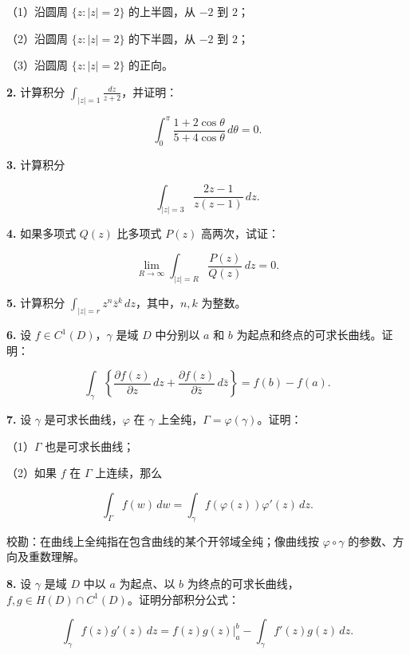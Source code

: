 \documentclass[11pt,a4paper]{article}
\begin{document}
（1）沿圆周 \(\{z:|z|=2\}\) 的上半圆，从 \(-2\) 到 \(2\)；

（2）沿圆周 \(\{z:|z|=2\}\) 的下半圆，从 \(-2\) 到 \(2\)；

（3）沿圆周 \(\{z:|z|=2\}\) 的正向。

\par{}
\noindent\textbf{2.} 计算积分 \(\int_{|z|=1}\frac{dz}{z+2}\)，并证明：

\[
\int_0^\pi\frac{1+2\cos\theta}{5+4\cos\theta}\,d\theta=0.
\]

\par{}
\noindent\textbf{3.} 计算积分

\[
\int_{|z|=3}\frac{2z-1}{z(z-1)}\,dz.
\]

\par{}
\noindent\textbf{4.} 如果多项式 \(Q(z)\) 比多项式 \(P(z)\) 高两次，试证：

\[
\lim_{R\to\infty}\int_{|z|=R}\frac{P(z)}{Q(z)}\,dz=0.
\]

\par{}
\noindent\textbf{5.} 计算积分 \(\int_{|z|=r}z^n\bar z^k\,dz\)，其中，\(n,k\)
为整数。

\par{}
\noindent\textbf{6.} 设 \(f\in C^1(D)\)，\(\gamma\) 是域 \(D\) 中分别以 \(a\) 和
\(b\) 为起点和终点的可求长曲线。证明：

\[
\int_\gamma\left\{\frac{\partial f(z)}{\partial z}\,dz
+\frac{\partial f(z)}{\partial\bar z}\,d\bar z\right\}=f(b)-f(a).
\]

\par{}
\noindent\textbf{7.} 设 \(\gamma\) 是可求长曲线，\(\varphi\) 在 \(\gamma\)
上全纯，\(\Gamma=\varphi(\gamma)\)。证明：

（1）\(\Gamma\) 也是可求长曲线；

（2）如果 \(f\) 在 \(\Gamma\) 上连续，那么

\[
\int_\Gamma f(w)\,dw
=\int_\gamma f(\varphi(z))\varphi'(z)\,dz.
\]

校勘：在曲线上全纯指在包含曲线的某个开邻域全纯；像曲线按
\(\varphi\circ\gamma\) 的参数、方向及重数理解。

\par{}
\noindent\textbf{8.} 设 \(\gamma\) 是域 \(D\) 中以 \(a\) 为起点、以 \(b\)
为终点的可求长曲线，\(f,g\in H(D)\cap C^1(D)\)。证明分部积分公式：

\[
\int_\gamma f(z)g'(z)\,dz
=\left.f(z)g(z)\right|_a^b-\int_\gamma f'(z)g(z)\,dz.
\]
\end{document}
